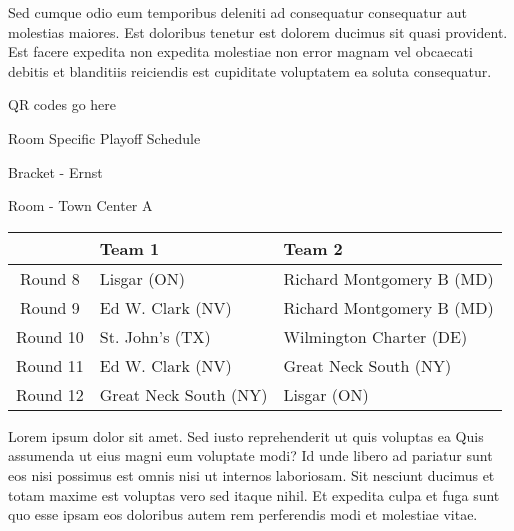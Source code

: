 \documentclass{article}%
\begin{document}
\newline%
Sed cumque odio eum temporibus deleniti ad consequatur consequatur aut molestias maiores. Est doloribus tenetur est dolorem ducimus sit quasi provident. Est facere expedita non expedita molestiae non error magnam vel obcaecati debitis et blanditiis reiciendis est cupiditate voluptatem ea soluta consequatur.%
\vspace*{140pt}%
\begin{center}%
\begin{Huge}%
QR codes go here%
\end{Huge}%
\end{center}%
\newpage%
\begin{center}%
\begin{Huge}%
Room Specific Playoff Schedule%
\end{Huge}%
\vspace*{8pt}%
\linebreak%
\begin{Large}%
Bracket {-} Ernst%
\end{Large}%
\vspace*{8pt}%
\linebreak%
\vspace*{8pt}%
\begin{Large}%
Room {-} Town Center A%
\end{Large}%
\end{center}%
%
\begin{tabularx}{\textwidth}{|c|Y|Y|}%
\hline%
&Team 1&Team 2\\%
\hline%
Round 8&Lisgar (ON)&Richard Montgomery B (MD)\\%
Round 9&Ed W. Clark (NV)&Richard Montgomery B (MD)\\%
Round 10&St. John's (TX)&Wilmington Charter (DE)\\%
Round 11&Ed W. Clark (NV)&Great Neck South (NY)\\%
Round 12&Great Neck South (NY)&Lisgar (ON)\\%
\hline%
\end{tabularx}%
\vspace*{8pt}%
\newline%
Lorem ipsum dolor sit amet. Sed iusto reprehenderit ut quis voluptas ea Quis assumenda ut eius magni eum voluptate modi? Id unde libero ad pariatur sunt eos nisi possimus est omnis nisi ut internos laboriosam. Sit nesciunt ducimus et totam maxime est voluptas vero sed itaque nihil. Et expedita culpa et fuga sunt quo esse ipsam eos doloribus autem rem perferendis modi et molestiae vitae.\newline%
\end{document}
